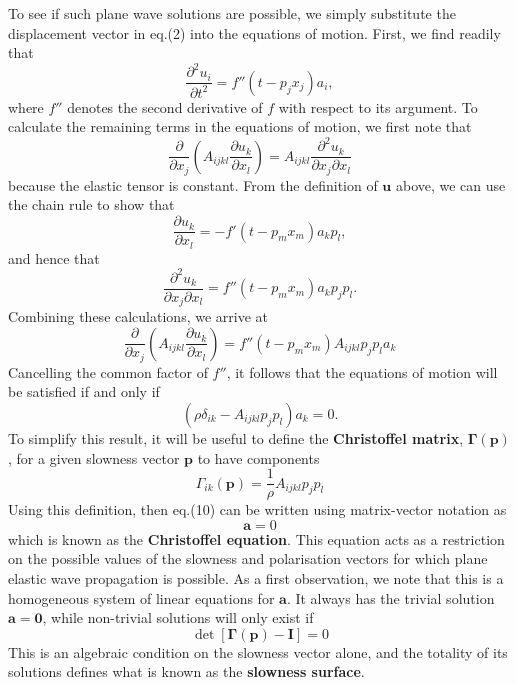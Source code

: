 \documentclass [a4paper,12pt]{paper}
\begin{document}
To see if such plane wave solutions are possible, we simply substitute the displacement vector in eq.(2) into the equations 
 of motion. First, we find readily that
\begin{equation}
\frac{\partial^{2}u_{i}}{\partial t^{2}}=f''(t-p_{j}x_{j})a_{i},
\end{equation}
where $f''$ denotes the second derivative of $f$ with respect to its argument. To calculate the remaining terms in the equations 
of motion, we first note that
\begin{equation}
\frac{\partial}{\partial x_{j}}\left(A_{ijkl}\frac{\partial u_{k}}{\partial x_{l}}\right)=A_{ijkl}\frac{\partial^{2}u_{k}}{\partial x_{j}\partial x_{l}}
\end{equation}
because the elastic tensor is constant. From the definition of $\mathbf{u}$ above, we can use the chain rule to show that
\begin{equation}
\frac{\partial u_{k}}{\partial x_{l}}=-f'(t-p_{m}x_{m})a_{k}p_{l},
\end{equation}
and hence that
\begin{equation}
\frac{\partial^{2}u_{k}}{\partial x_{j}\partial x_{l}}=f''(t-p_{m}x_{m})a_{k}p_{j}p_{l}.
\end{equation}
Combining these calculations, we arrive at
\begin{equation}
\frac{\partial}{\partial x_{j}}\left(A_{ijkl}\frac{\partial u_{k}}{\partial x_{l}}\right)=f''(t-p_{m}x_{m})A_{ijkl}p_{j}p_{l}a_{k}
\end{equation}
Cancelling the common factor of $f''$, it follows that the equations of motion will be satisfied if and only if
\begin{equation}
(\rho\delta_{ik}-A_{ijkl}p_{j}p_{l})a_{k}=0.
\end{equation}
To simplify this result, it will be useful to define the \textbf{Christoffel matrix}, $\bm{\Gamma}(\mathbf{p})$, 
for a given slowness vector $\mathbf{p}$ to have components
\begin{equation}
\Gamma_{ik}(\mathbf{p})=\frac{1}{\rho}A_{ijkl}p_{j}p_{l}
\end{equation}
Using this definition, then eq.(10) can be written using matrix-vector notation as
\begin{equation}
[\bm{\Gamma}(\mathbf{p})-\mathbf{I}]\mathbf{a}=0
\end{equation}
which is known as the \textbf{Christoffel equation}. This equation acts as a restriction on the possible values 
of the slowness and polarisation vectors for which plane elastic wave propagation is possible.
As a first observation, we note that this is a homogeneous system of linear equations for $\mathbf{a}$.
It always has the trivial solution $\mathbf{a}=\mathbf{0}$, while non-trivial solutions will only exist if
\begin{equation}
\det[\bm{\Gamma}(\mathbf{p})-\mathbf{I}]=0
\end{equation}
This is an algebraic condition on the slowness vector alone, and the totality of its solutions defines what is known as the \textbf{slowness surface}.
\end{document}
